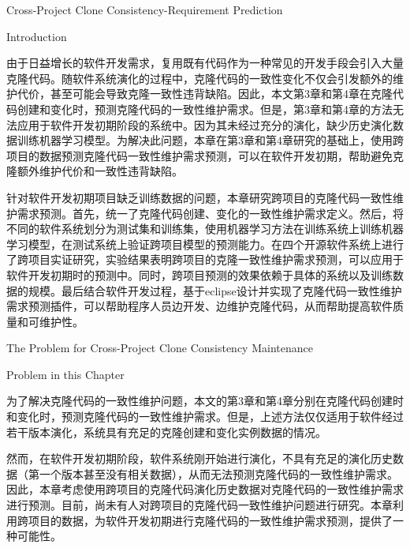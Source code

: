 
{Cross-Project Clone Consistency-Requirement Prediction}

{Introduction}

由于日益增长的软件开发需求，复用既有代码作为一种常见的开发手段会引入大量克隆代码。随软件系统演化的过程中，克隆代码的一致性变化不仅会引发额外的维护代价，甚至可能会导致克隆一致性违背缺陷。因此，本文第3章和第4章在克隆代码创建和变化时，预测克隆代码的一致性维护需求。但是，第3章和第4章的方法无法应用于软件开发初期阶段的系统中。因为其未经过充分的演化，缺少历史演化数据训练机器学习模型。为解决此问题，本章在第3章和第4章研究的基础上，使用跨项目的数据预测克隆代码一致性维护需求预测，可以在软件开发初期，帮助避免克隆额外维护代价和一致性违背缺陷。

针对软件开发初期项目缺乏训练数据的问题，本章研究跨项目的克隆代码一致性维护需求预测。首先，统一了克隆代码创建、变化的一致性维护需求定义。然后，将不同的软件系统划分为测试集和训练集，使用机器学习方法在训练系统上训练机器学习模型，在测试系统上验证跨项目模型的预测能力。在四个开源软件系统上进行了跨项目实证研究，实验结果表明跨项目的克隆一致性维护需求预测，可以应用于软件开发初期时的预测中。同时，跨项目预测的效果依赖于具体的系统以及训练数据的规模。最后结合软件开发过程，基于eclipse设计并实现了克隆代码一致性维护需求预测插件，可以帮助程序人员边开发、边维护克隆代码，从而帮助提高软件质量和可维护性。

{The Problem for Cross-Project Clone Consistency Maintenance}

{Problem in this Chapter}


为了解决克隆代码的一致性维护问题，本文的第3章和第4章分别在克隆代码创建时和变化时，预测克隆代码的一致性维护需求。但是，上述方法仅仅适用于软件经过若干版本演化，系统具有充足的克隆创建和变化实例数据的情况。

然而，在软件开发初期阶段，软件系统刚开始进行演化，不具有充足的演化历史数据（第一个版本甚至没有相关数据），从而无法预测克隆代码的一致性维护需求。因此，本章考虑使用跨项目的克隆代码演化历史数据对克隆代码的一致性维护需求进行预测。目前，尚未有人对跨项目的克隆代码一致性维护问题进行研究。本章利用跨项目的数据，为软件开发初期进行克隆代码的一致性维护需求预测，提供了一种可能性。

